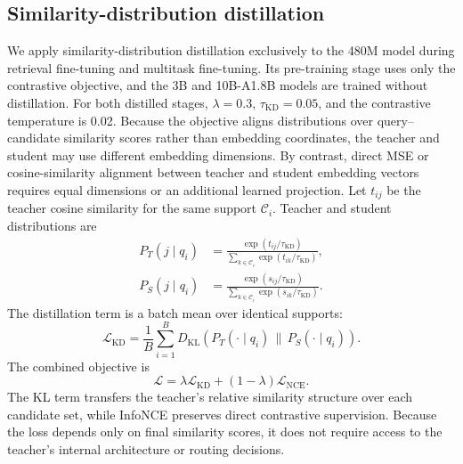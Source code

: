 \documentclass{article}
\begin{document}
\subsection{Similarity-distribution distillation}
\label{sec:distill}

We apply similarity-distribution distillation exclusively to the 480M model during retrieval fine-tuning and multitask fine-tuning.
Its pre-training stage uses only the contrastive objective, and the 3B and 10B-A1.8B models are trained without distillation.
For both distilled stages, $\lambda=0.3$, $\tau_{\mathrm{KD}}=0.05$, and the contrastive temperature is 0.02.
Because the objective aligns distributions over query--candidate similarity scores rather than embedding coordinates, the teacher and student may use different embedding dimensions.
By contrast, direct MSE or cosine-similarity alignment between teacher and student embedding vectors requires equal dimensions or an additional learned projection.
Let $t_{ij}$ be the teacher cosine similarity for the same support $\mathcal{C}_i$.
Teacher and student distributions are
\begin{align}
P_T(j\mid q_i) &= \frac{\exp(t_{ij}/\tau_{\mathrm{KD}})}
 {\sum_{k\in\mathcal{C}_i}\exp(t_{ik}/\tau_{\mathrm{KD}})}, \\
P_S(j\mid q_i) &= \frac{\exp(s_{ij}/\tau_{\mathrm{KD}})}
 {\sum_{k\in\mathcal{C}_i}\exp(s_{ik}/\tau_{\mathrm{KD}})}.
\end{align}
The distillation term is a batch mean over identical supports:
\begin{equation}
  \mathcal{L}_{\mathrm{KD}} = \frac{1}{B}\sum_{i=1}^{B}
  D_{\mathrm{KL}}\!\left(P_T(\cdot\mid q_i)\,\|\,P_S(\cdot\mid q_i)\right).
  \label{eq:kd}
\end{equation}
The combined objective is
\begin{equation}
  \mathcal{L}=\lambda\mathcal{L}_{\mathrm{KD}}
  +(1-\lambda)\mathcal{L}_{\mathrm{NCE}}.
  \label{eq:combined}
\end{equation}
The KL term transfers the teacher's relative similarity structure over each candidate set, while InfoNCE preserves direct contrastive supervision.
Because the loss depends only on final similarity scores, it does not require access to the teacher's internal architecture or routing decisions.
\end{document}
